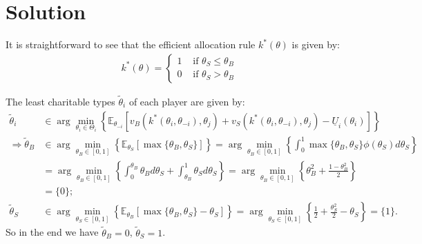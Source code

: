 \documentclass[a4paper]{article}
\newif\ifsolutions
\begin{document}
\ifsolutions
\section*{Solution}
It is straightforward to see that the efficient allocation rule $k^*(\theta)$ is given by:
\begin{align*}
	k^*(\theta)= \begin{cases}
		1 & \text{ if } \theta_S \leq \theta_B \\ 
		0 & \text{ if } \theta_S > \theta_B
	\end{cases}
\end{align*}

The least charitable types $\tilde{\theta}_i$ of each player are given by:
\begin{align*}
	\tilde{\theta}_i &\in \arg \min_{\theta_i \in \Theta_i} \left\{ \mathbb{E}_{\theta_{-i}} \left[ v_B (k^*(\theta_i,\theta_{-i}),\theta_j) + v_S (k^*(\theta_i,\theta_{-i}),\theta_j) - \underline{U}_i (\theta_i) \right] \right\}
	\\
	\Rightarrow \tilde{\theta}_B &\in \arg \min_{\theta_B \in [0,1]} \left\{ \mathbb{E}_{\theta_S} \left[ \max\{\theta_B,\theta_S\} \right] \right\} 
	= \arg \min_{\theta_B \in [0,1]} \left\{ \int_0^1 \max\{\theta_B,\theta_S\} \phi(\theta_S) d\theta_S \right\}
	\\
	&= \arg \min_{\theta_B \in [0,1]} \left\{ \int_0^{\theta_B} \theta_B d\theta_S + \int_{\theta_B}^1 \theta_S d\theta_S \right\}
	= \arg \min_{\theta_B \in [0,1]} \left\{ \theta_B^2 +  \frac{1-\theta_B^2}{2} \right\}	
	\\
	&= \{ 0 \};
	\\
	\tilde{\theta}_S &\in \arg \min_{\theta_S \in [0,1]} \left\{ \mathbb{E}_{\theta_B} \left[ \max\{\theta_B,\theta_S\} - \theta_S \right] \right\} = \arg \min_{\theta_S \in [0,1]} \left\{ \frac{1}{2} + \frac{\theta_S^2}{2} - \theta_S \right\} = \{1\}.
\end{align*}
So in the end we have $\tilde{\theta}_B = 0$, $\tilde{\theta}_S = 1$. 
\end{document}
